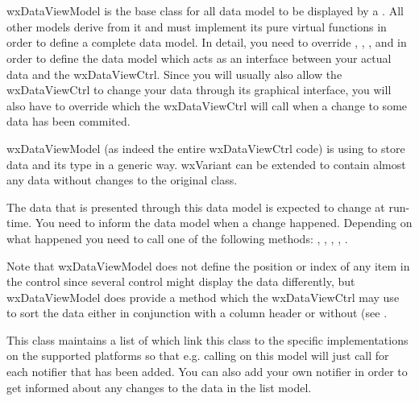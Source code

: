 
\section{}\label{wxdataviewmodel}

wxDataViewModel is the base class for all data model to be
displayed by a . 
All other models derive from it and must implement its
pure virtual functions in order to define a complete
data model. In detail, you need to override 
,
,
,
 and
 in order to
define the data model which acts as an interface between 
your actual data and the wxDataViewCtrl. Since you will
usually also allow the wxDataViewCtrl to change your data
through its graphical interface, you will also have to override
 which the
wxDataViewCtrl will call when a change to some data has been
commited.

wxDataViewModel (as indeed the entire wxDataViewCtrl
code) is using  to store data and
its type in a generic way. wxVariant can be extended to contain
almost any data without changes to the original class.

The data that is presented through this data model is expected
to change at run-time. You need to inform the data model when
a change happened. Depending on what happened you need to call
one of the following methods: 
,
,
,
,
.

Note that wxDataViewModel does not define the position or
index of any item in the control since several control might
display the data differently, but wxDataViewModel does
provide a  method
which the wxDataViewCtrl may use to sort the data either
in conjunction with a column header or without (see
.

This class maintains a list of 
which link this class to the specific implementations on the
supported platforms so that e.g. calling 
on this model will just call 
for each notifier that has been added. You can also add 
your own notifier in order to get informed about any changes 
to the data in the list model.

